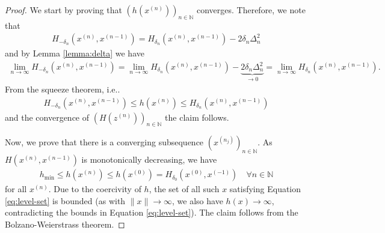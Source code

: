 \documentclass[onecolumn,final,a4paper,13pt,reqno]{siamart}
\makeatletter
\DeclareRobustCommand\onedot{\futurelet\@let@token\@onedot}
\def\@onedot{\ifx\@let@token.\else.\null\fi\xspace}
\def\ie{{i.e}\onedot} \def\Ie{{I.e}\onedot}
\makeatother
\begin{document}
\begin{proof}
	We start by proving that $(h(x^{(n)}))_{n \in \mathbb{N}}$ converges. Therefore, we note that
	\begin{align}
		H_{-\delta_n}(x^{(n)}, x^{(n - 1)}) = H_{\delta_n}(x^{(n)}, x^{(n - 1)}) - 2\delta_n \Delta_n^2
	\end{align}
	and by Lemma \ref{lemma:delta} we have
	\begin{align}
		\lim_{n \rightarrow \infty} H_{-\delta_n}(x^{(n)}, x^{(n - 1)}) = \lim_{n \rightarrow \infty} H_{\delta_n}(x^{(n)}, x^{(n - 1)}) - \underbrace{2\delta_n\Delta_n^2}_{\rightarrow 0} = \lim_{n \rightarrow \infty} H_{\delta_n}(x^{(n)}, x^{(n - 1)}).
	\end{align}
	From the squeeze theorem, \ie
	\begin{align}
		H_{-\delta_n} (x^{(n)}, x^{(n - 1)}) \leq h(x^{(n)}) \leq H_{\delta_n}(x^{(n)}, x^{(n - 1)})
	\end{align}
	and the convergence of $(H(z^{(n)}))_{n \in \mathbb{N}}$ the claim follows.
	
	Now, we prove that there is a converging subsequence $(x^{(n_j)})_{n \in \mathbb{N}}$. As $H(x^{(n)}, x^{(n - 1)})$ is monotonically decreasing, we have
	\begin{align}
		h_{\min} \leq h(x^{(n)}) \leq h(x^{(0)}) = H_{\delta_0}(x^{(0)}, x^{(-1)})\quad\forall n\in\mathbb{N}\label{eq:level-set}
	\end{align}
	for all $x^{(n)}$. Due to the coercivity of $h$, the set of all such $x$ satisfying Equation \eqref{eq:level-set} is bounded (as with $\|x\| \rightarrow \infty$, we also have $h(x) \rightarrow \infty$, contradicting the bounds in Equation \eqref{eq:level-set}). The claim follows from the Bolzano-Weierstrass theorem.
	

\end{proof}
\end{document}
